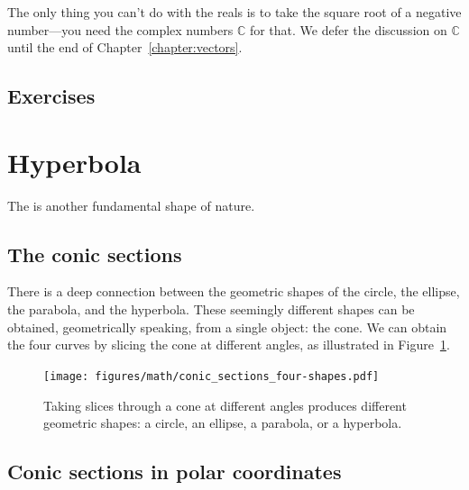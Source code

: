 		The only thing you can't do with the reals is to take the square root of a negative number---you 							
		need the complex numbers $\mathbb{C}$ for that.
		We defer the discussion on $\mathbb{C}$ until the end of Chapter~\ref{chapter:vectors}.


	\subsection{Exercises}
	\label{numbers:exercises}
	
		
	


\section{Hyperbola}
\label{sec:hyperbola}

	The  is another fundamental shape of nature.
	

	\subsection{The conic sections}

		There is a deep connection between the geometric shapes of the circle,
		the ellipse, the parabola, and the hyperbola.
		These seemingly different shapes can be obtained, geometrically speaking,
		from a single object: the cone.															
		We can obtain the four curves by slicing the cone at different angles,
		as illustrated in Figure~\ref{fig:conic_sections_four-shapes}.

		\begin{figure}[htb]
			\centering
			\texttt{[image: figures/math/conic\_sections\_four-shapes.pdf]}
			\vspace{-2mm}
			\caption{	Taking slices through a cone at different angles produces different geometric shapes:
					a circle, an ellipse, a parabola, or a hyperbola.}
			\label{fig:conic_sections_four-shapes}
		\end{figure}
	

	\subsection{Conic sections in polar coordinates}

